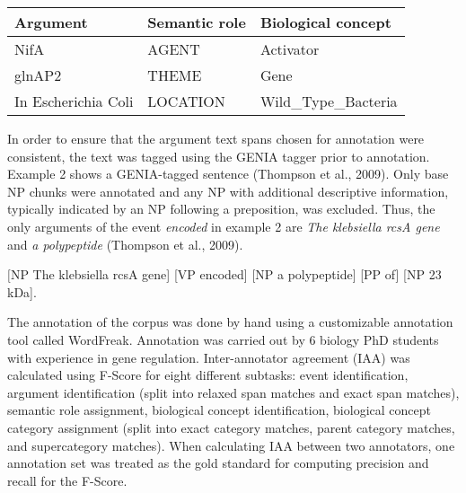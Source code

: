 \documentclass[11pt]{article}
\begin{document}
\begin{center}
\begin{tabular}{l l l}
\hline
{\bf Argument} & {\bf Semantic role} & {\bf Biological concept} \\ \hline
NifA & AGENT & Activator \\ \hline
glnAP2 & THEME & Gene \\ \hline
In Escherichia Coli & LOCATION & Wild\_Type\_Bacteria \\ \hline
\end{tabular}
\label{tab:labels}
\end{center}


In order to ensure that the argument text spans chosen for annotation were consistent, the text was tagged using the GENIA tagger prior to annotation.  Example 2 shows a GENIA-tagged sentence (Thompson et al., 2009).  Only base NP chunks were annotated and any NP with additional descriptive information, typically indicated by an NP following a preposition,  was excluded.  Thus, the only arguments of the event {\it encoded} in example 2 are {\it The klebsiella rcsA gene} and {\it a polypeptide} (Thompson et al., 2009).

\begin{exe}
	\ex $[$NP The klebsiella rcsA gene] [VP encoded] [NP a polypeptide] [PP of] [NP 23 kDa].
\end{exe}





The annotation of the corpus was done by hand using a customizable annotation tool called WordFreak.  Annotation was carried out by 6 biology PhD students with experience in gene regulation.  Inter-annotator agreement (IAA) was calculated using F-Score for eight different subtasks: event identification, argument identification (split into relaxed span matches and exact span matches), semantic role assignment, biological concept identification, biological concept category assignment (split into exact category matches, parent category matches, and supercategory matches).  When calculating IAA between two annotators, one annotation set was treated as the gold standard for computing precision and recall for the F-Score.  
\end{document}
